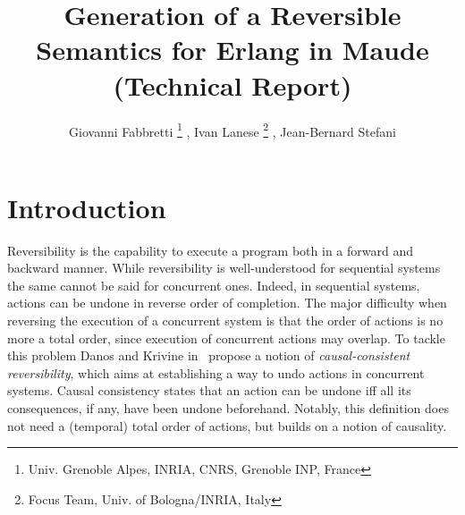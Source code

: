 \documentclass{article}[12pt,a4paper]
\theoremstyle{definition}
\newcommand{\footremember}[2]{%
    \footnote{#2}
    \newcounter{#1}
    \setcounter{#1}{\value{footnote}}%
}
\newcommand{\footrecall}[1]{%
    \footnotemark[\value{#1}]%
}
\begin{document}
\title{Generation of a Reversible Semantics for Erlang in Maude (Technical Report)}

\author{Giovanni Fabbretti\footremember{Gre}{Univ. Grenoble Alpes, INRIA, CNRS, Grenoble INP, France}, Ivan Lanese\footremember{Bol}{Focus Team, Univ. of Bologna/INRIA, Italy}, Jean-Bernard Stefani\footrecall{Gre}}
\date{}

\maketitle %


\section{Introduction}


Reversibility is the capability to execute a program both in a forward
and backward manner. While reversibility is well-understood for
sequential systems the same cannot be said for concurrent
ones. Indeed, in sequential systems, actions can be undone in reverse
order of completion.  The major difficulty when reversing the
execution of a concurrent system is that the order of actions is no
more a total order, since execution of concurrent actions may overlap.
To tackle this problem Danos and Krivine in~\cite{DanosK04} propose a
notion of \emph{causal-consistent reversibility}, which aims at
establishing a way to undo actions in concurrent systems. Causal
consistency states that an action can be undone iff all its
consequences, if any, have been undone beforehand. Notably, this
definition does not need a (temporal) total order of actions, but
builds on a notion of causality.
\end{document}
